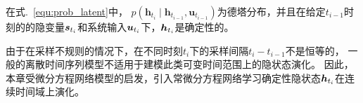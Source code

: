 在式.~\eqref{equ:prob_latent}中， $p\left(\boldsymbol{h}_{t_{i}} \mid \boldsymbol{h}_{t_{i-1}}, \boldsymbol{u}_{t_{i-1}}\right)$为德塔分布，并且在给定$t_{i-1}$时刻的的隐变量$\boldsymbol{s}_{t_i}$和系统输入$\boldsymbol{u}_{t_i}$下，$\boldsymbol{h}_{t_i}$是确定性的。

由于在采样不规则的情况下，在不同时刻$t_i$下的采样间隔$t_i - t_{i-1}$不是恒等的，
一般的离散时间序列模型不适用于建模此类可变时间范围上的隐状态演化。
因此，本章受微分方程网络模型\cite{chen2018neuralode,Rubanova2019}的启发，引入常微分方程网络学习确定性隐状态$\boldsymbol{h}_{t_i}$在连续时间域上演化。

